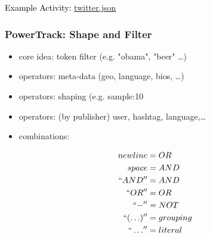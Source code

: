 \documentclass{beamer}
\begin{document}
{
\begin{frame}
  \begin{center}
\textcolor{black}{\Huge Example Activity: \hyperlink{file://localhost/Users/scotthendrickson/Documents/DSBAMeetup2012/twitter_record.html}{twitter.json}}
  \end{center}
\end{frame}
}

\begin{frame}\frametitle{PowerTrack: Shape and Filter}
\begin{itemize}
\item core idea: token filter (e.g. "obama", "beer" \ldots)
\item operators: meta-data (geo, language, bios, \ldots)
\item operators: shaping (e.g. sample:10%
\item operators: (by publisher) user, hashtag, language,\ldots
\item combinations:  
\end{itemize}


\begin{equation*}
\begin{aligned}
        newline &= OR \\
        space &= AND \\
        ``AND'' &= AND \\
        ``OR'' &= OR \\
        ``-'' &= NOT \\
        ``(\ldots)'' &= grouping\\
        `` \ldots ''  &= literal \\
\end{aligned}
\end{equation*}
\end{frame}
\end{document}
